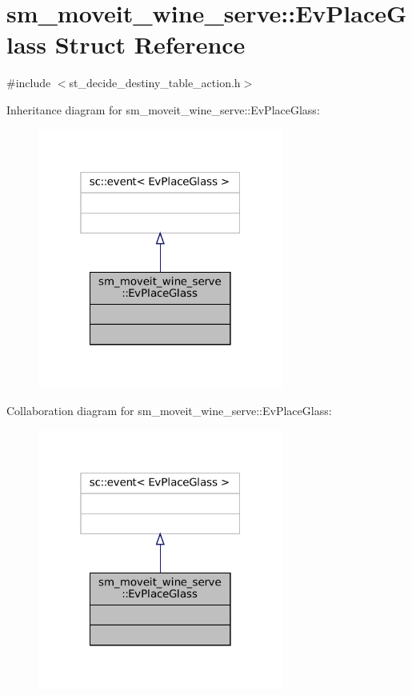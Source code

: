 \hypertarget{structsm__moveit__wine__serve_1_1EvPlaceGlass}{}\section{sm\+\_\+moveit\+\_\+wine\+\_\+serve\+:\+:Ev\+Place\+Glass Struct Reference}
\label{structsm__moveit__wine__serve_1_1EvPlaceGlass}


{\ttfamily \#include $<$st\+\_\+decide\+\_\+destiny\+\_\+table\+\_\+action.\+h$>$}



Inheritance diagram for sm\+\_\+moveit\+\_\+wine\+\_\+serve\+:\+:Ev\+Place\+Glass\+:
\nopagebreak
\begin{figure}[H]
\begin{center}
\leavevmode
\includegraphics[width=229pt]{structsm__moveit__wine__serve_1_1EvPlaceGlass__inherit__graph}
\end{center}
\end{figure}


Collaboration diagram for sm\+\_\+moveit\+\_\+wine\+\_\+serve\+:\+:Ev\+Place\+Glass\+:
\nopagebreak
\begin{figure}[H]
\begin{center}
\leavevmode
\includegraphics[width=229pt]{structsm__moveit__wine__serve_1_1EvPlaceGlass__coll__graph}
\end{center}
\end{figure}


